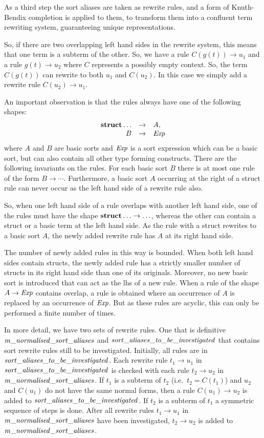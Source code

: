 \documentclass{article}
\begin{document}
As a third step the sort aliases are taken as rewrite rules, and 
a form of Knuth-Bendix completion is applied to them, to transform them
into a confluent term rewriting system, guaranteeing unique representations.

So, if there are two overlapping left hand sides in the rewrite system, this
means that one term is a subterm of the other. So, we have a rule 
$C(g(t))\rightarrow u_1$ and a rule $g(t)\rightarrow u_2$ where $C$ represents a
possibly empty context. So, the term
$C(g(t))$ can rewrite to both $u_1$ and $C(u_2)$. In this case we simply add
a rewrite rule $C(u_2)\rightarrow u_1$. 

An important observation is that the rules always have one of the following 
shapes:
\[\begin{array}{rcl}
{\bf struct}\ldots  &\rightarrow& A,\\
B&\rightarrow & {\it Exp}
\end{array}\]
where $A$ and $B$ are basic sorts and ${\it Exp}$ is a sort expression which
can be a basic sort, but can also contain all other type forming constructs.
There are the following invariants on the rules. 
For each basic sort $B$ there is at most one rule of the form
$B\rightarrow \cdots$. Furthermore, a basic sort $A$ occurring at the right
of a struct rule can never occur as the left hand side of a rewrite rule also. 
 
So, when one left hand side of a rule overlaps with another left hand side, one of the rules
must have the shape ${\bf struct}\ldots \rightarrow\ldots$, whereas the other
can contain a struct or a basic term at the left hand side. As the rule with
a struct rewrites to a basic sort $A$, the newly added rewrite rule has $A$ at
its right hand side. 

The number of newly added rules in this way is bounded. When both left hand sides contain 
structs,
the newly added rule has a strictly smaller number of structs in its right hand side
than one of its originals. Moreover, no new basic sort is introduced that can 
act as the lhs of a new rule. When a rule of the shape $A\rightarrow {\it Exp}$ contains overlap,
a rule is obtained where an occurrence of $A$ is replaced by an occurrence of ${\it Exp}$.
But as these rules are acyclic, this can only be performed a finite number of times.

In more detail, we have two sets of rewrite rules. One that is definitive
${\it m\_normalised\_sort\_aliases}$ and $\it sort\_aliases\_to\_be\_investigated$ 
that contains sort rewrite rules
still to be investigated. Initially, all rules are in 
$\it sort\_aliases\_to\_be\_investigated$. Each rewrite rule $t_1\rightarrow u_1$
in $\it sort\_aliases\_to\_be\_investigated$ is checked with
each rule $t_2\rightarrow u_2$ in ${\it m\_normalised\_sort\_aliases}$.
If $t_1$ is a subterm of $t_2$ (i.e.\ $t_2=C(t_1)$) and 
$u_2$ and $C(u_1)$ do not have the same normal forms, then a rule $C(u_1)\rightarrow
u_2$ is added to $\it sort\_aliases\_to\_be\_investigated$.
If $t_2$ is a subterm of $t_1$ a symmetric sequence of steps is done.
After all rewrite rules $t_1\rightarrow u_1$ in ${\it m\_normalised\_sort\_aliases}$
have been investigated, $t_2\rightarrow u_2$ is added to 
${\it m\_normalised\_sort\_aliases}$.
\end{document}
